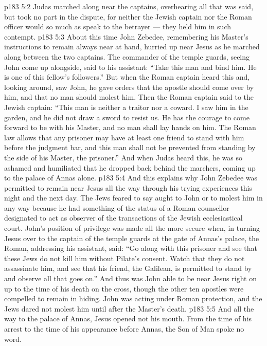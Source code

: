 \vs p183 5:2 Judas marched along near the captains, overhearing all that was said, but took no part in the dispute, for neither the Jewish captain nor the Roman officer would so much as speak to the betrayer --- they held him in such contempt.
\vs p183 5:3 About this time John Zebedee, remembering his Master’s instructions to remain always near at hand, hurried up near Jesus as he marched along between the two captains. The commander of the temple guards, seeing John come up alongside, said to his assistant: “Take this man and bind him. He is one of this fellow’s followers.” But when the Roman captain heard this and, looking around, saw John, he gave orders that the apostle should come over by him, and that no man should molest him. Then the Roman captain said to the Jewish captain: “This man is neither a traitor nor a coward. I saw him in the garden, and he did not draw a sword to resist us. He has the courage to come forward to be with his Master, and no man shall lay hands on him. The Roman law allows that any prisoner may have at least one friend to stand with him before the judgment bar, and this man shall not be prevented from standing by the side of his Master, the prisoner.” And when Judas heard this, he was so ashamed and humiliated that he dropped back behind the marchers, coming up to the palace of Annas alone.
\vs p183 5:4 And this explains why John Zebedee was permitted to remain near Jesus all the way through his trying experiences this night and the next day. The Jews feared to say aught to John or to molest him in any way because he had something of the status of a Roman counsellor designated to act as observer of the transactions of the Jewish ecclesiastical court. John’s position of privilege was made all the more secure when, in turning Jesus over to the captain of the temple guards at the gate of Annas’s palace, the Roman, addressing his assistant, said: “Go along with this prisoner and see that these Jews do not kill him without Pilate’s consent. Watch that they do not assassinate him, and see that his friend, the Galilean, is permitted to stand by and observe all that goes on.” And thus was John able to be near Jesus right on up to the time of his death on the cross, though the other ten apostles were compelled to remain in hiding. John was acting under Roman protection, and the Jews dared not molest him until after the Master’s death.
\vs p183 5:5 And all the way to the palace of Annas, Jesus opened not his mouth. From the time of his arrest to the time of his appearance before Annas, the Son of Man spoke no word.
\quizlink
